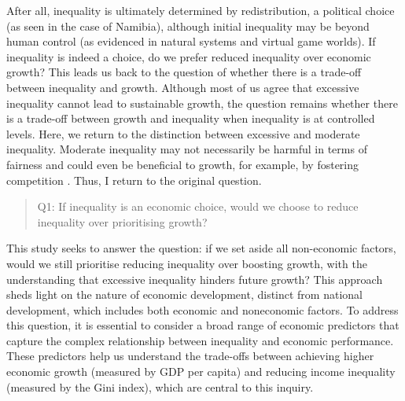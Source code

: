 \documentclass[12pt]{article}
\begin{document}
After all, inequality is ultimately determined by redistribution, a political choice (as seen in the case of Namibia), although initial inequality may be beyond human control (as evidenced in natural systems and virtual game worlds). If inequality is indeed a choice, do we prefer reduced inequality over economic growth? This leads us back to the question of whether there is a trade-off between inequality and growth. Although most of us agree that excessive inequality cannot lead to sustainable growth, the question remains whether there is a trade-off between growth and inequality when inequality is at controlled levels. Here, we return to the distinction between excessive and moderate inequality. Moderate inequality may not necessarily be harmful in terms of fairness \parencite{ku2013procedural} and could even be beneficial to growth, for example, by fostering competition \parencite{ferreira2022impact}. Thus, I return to the original question. 
 \begin{quote}
    Q1: If inequality is an economic choice, would we choose to reduce inequality over prioritising growth?
\end{quote}
This study seeks to answer the question: if we set aside all non-economic factors, would we still prioritise reducing inequality over boosting growth, with the understanding that excessive inequality hinders future growth? This approach sheds light on the nature of economic development, distinct from national development, which includes both economic and noneconomic factors. To address this question, it is essential to consider a broad range of economic predictors that capture the complex relationship between inequality and economic performance. These predictors help us understand the trade-offs between achieving higher economic growth (measured by GDP per capita) and reducing income inequality (measured by the Gini index), which are central to this inquiry.
\end{document}
